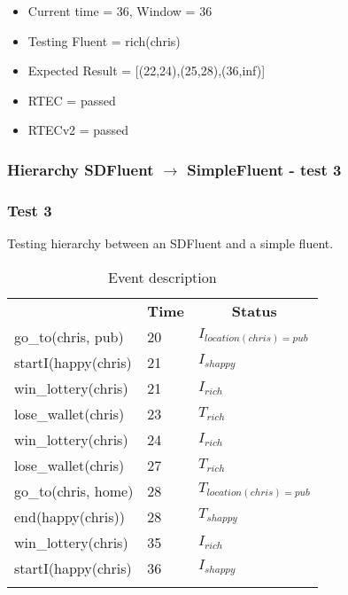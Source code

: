 \documentclass[8pt]{beamer}
\begin{document}
\begin{frame}
    \begin{itemize}
        \item Current time = 36, Window = 36
        \item Testing Fluent = rich(chris)
        \item Expected Result = [(22,24),(25,28),(36,inf)]
        \item RTEC = passed
        \item RTECv2 = passed

    \end{itemize}
\end{frame}


\begin{frame}
    \frametitle{Hierarchy SDFluent $\rightarrow$ SimpleFluent - test 3}
    \subsubsection{Test 3}

    \small Testing hierarchy between an SDFluent and a simple fluent.\linebreak
    \begin{minipage}{0.48\linewidth}
        \begin{table}[t!]
            \caption{Event description}
            \begin{center}

                \begin{tabular}{lll}
                    \hline\noalign{\smallskip}
                    \multicolumn{1}{l}{\textbf{Event}} & \multicolumn{1}{c}{\textbf{Time}} & \multicolumn{1}{c}{\textbf{Status}}  \\
                    go\_to(chris, pub)& 20 & $I_{location(chris)=pub}$\\
                    startI(happy(chris)& 21 & $I_{shappy}$\\
                    win\_lottery(chris)&21 &$I_{rich}$\\
                    lose\_wallet(chris)& 23 &$T_{rich}$\\
                    win\_lottery(chris)& 24 &$I_{rich}$\\
                    lose\_wallet(chris)& 27 &$T_{rich}$\\
                    go\_to(chris, home)& 28 &$T_{location(chris)=pub}$\\
                    end(happy(chris)) & 28 &$T_{shappy}$\\

                    win\_lottery(chris)& 35&$I_{rich}$\\
                    startI(happy(chris)& 36 & $I_{shappy}$\\
                    \noalign{\smallskip}
                    \hline
                \end{tabular}
            \end{center}
        \end{table}
    \end{minipage}
    \begin{minipage}{0.48\linewidth}


\end{minipage}
\end{frame}
\end{document}
